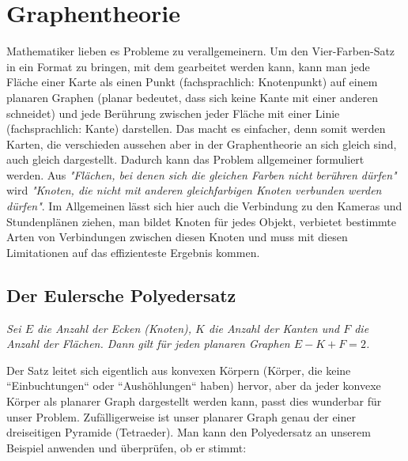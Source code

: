 \section{Graphentheorie}
Mathematiker lieben es Probleme zu verallgemeinern. Um den Vier-Farben-Satz in ein Format zu bringen, mit dem gearbeitet werden kann, kann man jede Fläche einer Karte als einen Punkt (fachsprachlich: Knotenpunkt) auf einem planaren Graphen (planar bedeutet, dass sich keine Kante mit einer anderen schneidet) und jede Berührung zwischen jeder Fläche mit einer Linie (fachsprachlich: Kante) darstellen. Das macht es einfacher, denn somit werden Karten, die verschieden aussehen aber in der Graphentheorie an sich gleich sind, auch gleich dargestellt. Dadurch kann das Problem allgemeiner formuliert werden. Aus \textit{"Flächen, bei denen sich die gleichen Farben nicht berühren dürfen"} wird \textit{"Knoten, die nicht mit anderen gleichfarbigen Knoten verbunden werden dürfen"}. Im Allgemeinen lässt sich hier auch die Verbindung zu den Kameras und Stundenplänen ziehen, man bildet Knoten für jedes Objekt, verbietet bestimmte Arten von Verbindungen zwischen diesen Knoten und muss mit diesen Limitationen auf das effizienteste Ergebnis kommen. 

\begin{center}
\end{center}

\subsection{Der Eulersche Polyedersatz}
\begin{center}
    \textit{Sei $E$ die Anzahl der Ecken (Knoten), $K$ die Anzahl der Kanten und $F$ die Anzahl der Flächen. Dann gilt für jeden planaren Graphen $E-K+F=2$.}
\end{center}
Der Satz leitet sich eigentlich aus konvexen Körpern (Körper, die keine ``Einbuchtungen`` oder ``Aushöhlungen`` haben) hervor, aber da jeder konvexe Körper als planarer Graph dargestellt werden kann, passt dies wunderbar für unser Problem. Zufälligerweise ist unser planarer Graph genau der einer dreiseitigen Pyramide (Tetraeder). Man kann den Polyedersatz an unserem Beispiel anwenden und überprüfen, ob er stimmt:

